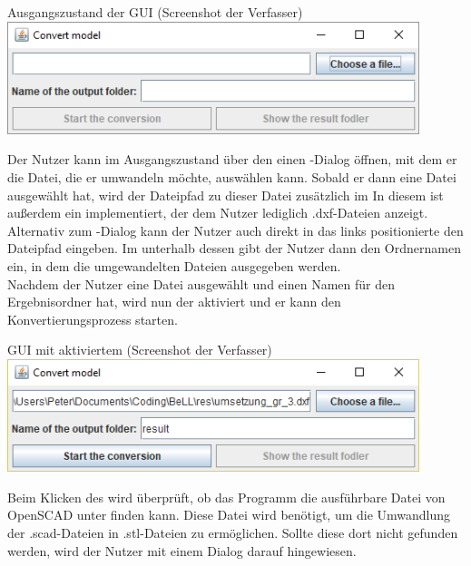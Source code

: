 \begin{Bild}{Ausgangszustand der GUI (Screenshot der Verfasser)}
	\includegraphics[width = 120mm]{Bilder/GUI/GUI_Startup}
\end{Bild}

Der Nutzer kann im Ausgangszustand über den  einen -Dialog öffnen, mit dem er die Datei, die er umwandeln möchte, auswählen kann.
Sobald er dann eine Datei ausgewählt hat, wird der Dateipfad zu dieser Datei zusätzlich im 
In diesem  ist außerdem ein  implementiert, der dem Nutzer lediglich .dxf-Dateien anzeigt.
Alternativ zum -Dialog kann der Nutzer auch direkt in das links positionierte  den Dateipfad eingeben.
Im  unterhalb dessen gibt der Nutzer dann den Ordnernamen ein, in dem die umgewandelten Dateien ausgegeben werden.\\
Nachdem der Nutzer eine Datei ausgewählt und einen Namen für den Ergebnisordner hat, wird nun der  aktiviert und er kann den Konvertierungsprozess starten.

\begin{Bild}{GUI mit aktiviertem  (Screenshot der Verfasser)}
	\includegraphics[width = 120mm]{Bilder/GUI/GUI_Convert_Ready}
\end{Bild}

Beim Klicken des  wird überprüft, ob das Programm die ausführbare Datei von OpenSCAD unter  finden kann.
Diese Datei wird benötigt, um die Umwandlung der .scad-Dateien in .stl-Dateien zu ermöglichen.
Sollte diese dort nicht gefunden werden, wird der Nutzer mit einem Dialog darauf hingewiesen.

